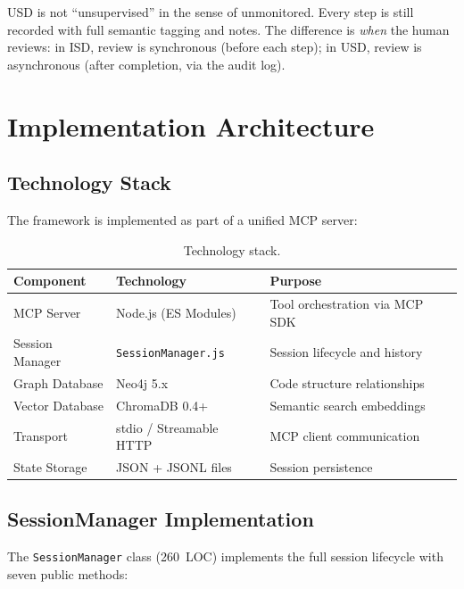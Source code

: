 \documentclass[11pt,letterpaper]{article}
\begin{document}
\begin{keyinsight}
USD is not ``unsupervised'' in the sense of unmonitored.
Every step is still recorded with full semantic tagging and notes.
The difference is \emph{when} the human reviews: in ISD, review is
synchronous (before each step); in USD, review is asynchronous
(after completion, via the audit log).
\end{keyinsight}

\section{Implementation Architecture}
\label{sec:architecture}

\subsection{Technology Stack}

The framework is implemented as part of a unified MCP server:

\begin{table}[h]
\centering
\caption{Technology stack.}
\label{tab:stack}
\begin{tabular}{@{}lll@{}}
\toprule
\textbf{Component} & \textbf{Technology} & \textbf{Purpose} \\
\midrule
MCP Server       & Node.js (ES Modules) & Tool orchestration via MCP SDK \\
Session Manager  & \texttt{SessionManager.js} & Session lifecycle and history \\
Graph Database   & Neo4j 5.x & Code structure relationships \\
Vector Database  & ChromaDB 0.4+ & Semantic search embeddings \\
Transport        & stdio / Streamable HTTP & MCP client communication \\
State Storage    & JSON + JSONL files & Session persistence \\
\bottomrule
\end{tabular}
\end{table}

\subsection{SessionManager Implementation}

The \texttt{SessionManager} class (260~LOC) implements the full session
lifecycle with seven public methods:
\end{document}
